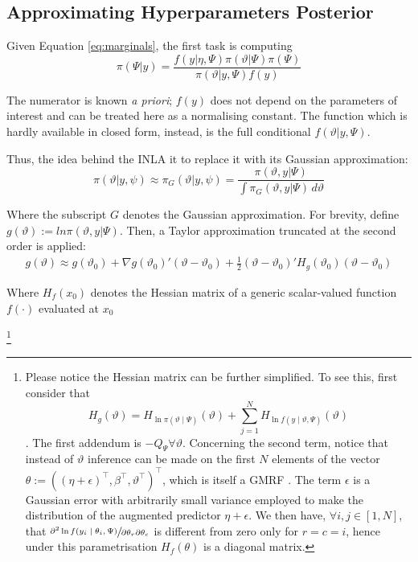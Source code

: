 \documentclass[openany]{book}
\begin{document}
\subsection{Approximating Hyperparameters Posterior} \label{par:inla_psi}
Given Equation \ref{eq:marginals}, the first task is computing
 $$
\pi(\Psi | y) =  \frac{f(y | \eta, \Psi) \pi(\vartheta | \Psi) \pi(\Psi)}
{\pi(\vartheta | y, \Psi)f(y)} 
 $$
 
 The numerator is known \textit{a priori}; $f(y)$ does not depend on the parameters of interest and can be treated here as a normalising constant. The function which is hardly available in closed form, instead, is the full conditional $f(\vartheta | y, \Psi)$. 
 
 Thus, the idea behind the INLA it to replace it with its Gaussian approximation:
\begin{equation}
\label{eq:GaussianApprox}
\pi(\vartheta | y, \psi) \approx \pi_{G}(\vartheta | y, \psi) = \frac{\pi(\vartheta, y | \Psi)}{\int \pi_G(\vartheta, y | \Psi) \, d\vartheta}
\end{equation}

Where the subscript $G$ denotes the Gaussian approximation. For brevity, define $g(\vartheta) := ln \pi(\vartheta, y | \Psi)$. Then, a Taylor approximation truncated at the second order is applied:
\begin{align*}
g(\vartheta) \approx   g(\vartheta_0) + \nabla   g(\vartheta_0)'(\vartheta - \vartheta_0)+ \frac{1}{2}
(\vartheta - \vartheta_0)'H_g(\vartheta_0)(\vartheta - \vartheta_0)
\end{align*}

Where $H_f(x_0)$ denotes the Hessian matrix of a generic scalar-valued function $f(\cdot)$ evaluated at $x_0$

\footnote{
Please notice the Hessian matrix can be further simplified. To see this, first consider that 
$$H_g(\vartheta) = H_{ \ln \pi (\vartheta \mid \Psi)}(\vartheta) + \sum_{j=1}^{N} H_{\ln f(y \mid \vartheta, \Psi)}(\vartheta)$$. The first addendum is $-Q_{\Psi} \forall \vartheta$. Concerning the second term, notice that instead of $\vartheta$ inference can be made on the first $N$ elements of the vector $\theta:= ((\eta + \epsilon)^{\top}, \beta^{\top}, \vartheta^{\top})^{\top}$, which is itself a GMRF \citep{INLA2017}. The term $\epsilon$ is a Gaussian error with arbitrarily small variance employed to make the distribution of the augmented predictor $\eta + \epsilon$. We then have, $\forall i,j \in [1, N]$, that $\sfrac{\partial^2 \ln f(y_i \mid\theta_i, \Psi)}{\partial \theta_r \partial \theta_c}$ is different from zero only for $r = c = i$, hence under this parametrisation $H_f(\theta)$ is a diagonal matrix.}
\end{document}

